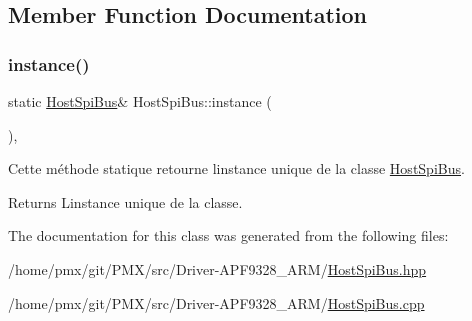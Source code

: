 \subsection{Member Function Documentation}
\mbox{\label{classHostSpiBus_ad8d44e1399e0d42ce0306b67e30ce08d}} 
\subsubsection{\texorpdfstring{instance()}{instance()}}
{\footnotesize\ttfamily static \hyperlink{classHostSpiBus}{Host\+Spi\+Bus}\& Host\+Spi\+Bus\+::instance (\begin{DoxyParamCaption}{ }\end{DoxyParamCaption})\hspace{0.3cm}{\ttfamily [inline]}, {\ttfamily [static]}}



Cette méthode statique retourne l\textquotesingle{}instance unique de la classe \hyperlink{classHostSpiBus}{Host\+Spi\+Bus}. 

\begin{DoxyReturn}{Returns}
L\textquotesingle{}instance unique de la classe. 
\end{DoxyReturn}


The documentation for this class was generated from the following files\+:\begin{DoxyCompactItemize}
\item 
/home/pmx/git/\+P\+M\+X/src/\+Driver-\/\+A\+P\+F9328\+\_\+\+A\+R\+M/\hyperlink{HostSpiBus_8hpp}{Host\+Spi\+Bus.\+hpp}\item 
/home/pmx/git/\+P\+M\+X/src/\+Driver-\/\+A\+P\+F9328\+\_\+\+A\+R\+M/\hyperlink{HostSpiBus_8cpp}{Host\+Spi\+Bus.\+cpp}\end{DoxyCompactItemize}
